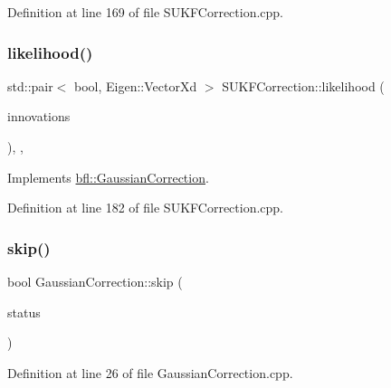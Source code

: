 Definition at line 169 of file S\+U\+K\+F\+Correction.\+cpp.

\mbox{\label{classbfl_1_1SUKFCorrection_a3217ddd6a205ff94de69e3b6d8de1fbe}} 
\subsubsection{\texorpdfstring{likelihood()}{likelihood()}}
{\footnotesize\ttfamily std\+::pair$<$ bool, Eigen\+::\+Vector\+Xd $>$ S\+U\+K\+F\+Correction\+::likelihood (\begin{DoxyParamCaption}\item[{const Eigen\+::\+Ref$<$ const Eigen\+::\+Matrix\+Xd $>$ \&}]{innovations }\end{DoxyParamCaption})\hspace{0.3cm}{\ttfamily [override]}, {\ttfamily [protected]}, {\ttfamily [virtual]}}



Implements \mbox{\hyperlink{classbfl_1_1GaussianCorrection_a08e227b697ffbaf97c85fb4b17c99fd4}{bfl\+::\+Gaussian\+Correction}}.



Definition at line 182 of file S\+U\+K\+F\+Correction.\+cpp.

\mbox{\label{classbfl_1_1GaussianCorrection_a986b05b149650ea4dd725b10700db57f}} 
\subsubsection{\texorpdfstring{skip()}{skip()}}
{\footnotesize\ttfamily bool Gaussian\+Correction\+::skip (\begin{DoxyParamCaption}\item[{const bool}]{status }\end{DoxyParamCaption})\hspace{0.3cm}{\ttfamily [inherited]}}



Definition at line 26 of file Gaussian\+Correction.\+cpp.




